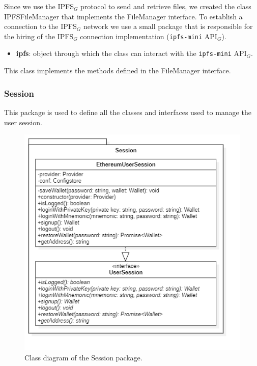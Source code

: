 				Since we use the IPFS$_{G}$ protocol to send and retrieve files, we created the class IPFSFileManager that implements the FileManager interface. To establish a connection to the IPFS$_{G}$ network we use a small package that is responsible for the hiring of the IPFS$_{G}$ connection implementation (\texttt{ipfs-mini} API$_{G}$). 
				
				\begin{itemize}
					\item \textbf{ipfs}: object through which the class can interact with the \texttt{ipfs-mini} API$_{G}$.
				\end{itemize}
				
				This class implements the methods defined in the FileManager interface. 
	
		\subsubsection{Session} 
		This package is used to define all the classes and interfaces used to manage the user session.
		\begin{figure} [h!]
			\centering
			\includegraphics[width=0.5\linewidth]{diagrammi/etherless-cli/Session}
			\caption{Class diagram of the Session package.}
		\end{figure}
			
